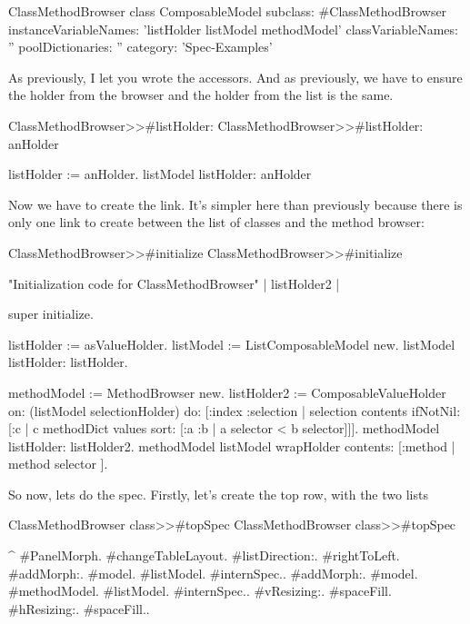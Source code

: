 \documentclass[a4paper,10pt,twoside]{book}
\begin{document}
\begin{classdef}{ClassMethodBrowser class}
ComposableModel subclass: #ClassMethodBrowser
	instanceVariableNames: 'listHolder listModel methodModel'
	classVariableNames: ''
	poolDictionaries: ''
	category: 'Spec-Examples'
\end{classdef}

As previously, I let you wrote the accessors. And as previously, we have to ensure the holder from the browser and the holder from the list is the same.

\begin{method}{ClassMethodBrowser>>\#listHolder:}
ClassMethodBrowser>>#listHolder: anHolder
	
	listHolder := anHolder.
	listModel listHolder: anHolder
\end{method}

Now we have to create the link. It's simpler here than previously because there is only one link to create between the list of classes and the method browser:

\begin{method}{ClassMethodBrowser>>\#initialize}
ClassMethodBrowser>>#initialize

	"Initialization code for ClassMethodBrowser"
	| listHolder2 |
	
	super initialize.
	
	listHolder := {} asValueHolder.
	listModel := ListComposableModel new.
	listModel listHolder: listHolder.
	
	methodModel := MethodBrowser new.
	listHolder2 := ComposableValueHolder on: (listModel selectionHolder) do: [:index :selection | selection contents ifNotNil: [:c | c methodDict values sort: [:a :b | a selector < b selector]]].
	methodModel listHolder: listHolder2.
	methodModel listModel wrapHolder contents: [:method | method selector ].
\end{method}

So now, lets do the spec. Firstly, let's create the top row, with the two lists

\begin{method}{ClassMethodBrowser class>>\#topSpec}
ClassMethodBrowser class>>#topSpec

	^{ #PanelMorph.
			#changeTableLayout.
			#listDirection:. #rightToLeft.
			#addMorph:. {#model. #listModel. #internSpec.}.
			#addMorph:. {#model. #methodModel. #listModel. #internSpec.}.
			#vResizing:. #spaceFill.
			#hResizing:. #spaceFill.}.
\end{method}
\end{document}
